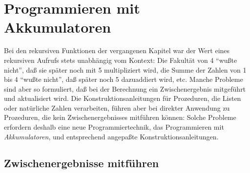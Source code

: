 
\chapter{Programmieren mit Akkumulatoren}
\label{cha:accu}

Bei den rekursiven Funktionen der vergangenen Kapitel war der Wert
eines rekursiven Aufrufs stets unabhängig vom Kontext: Die Fakultät
von 4 "`wußte nicht"', daß sie später noch mit 5 multipliziert wird,
die Summe der Zahlen von 1 bis 4 "`wußte nicht"', daß später noch 5
dazuaddiert wird, etc.  Manche Probleme sind aber so formuliert, daß
bei der Berechnung ein Zwischenergebnis mitgeführt und aktualisiert
wird.  Die Konstruktionsanleitungen für Prozeduren, die Listen oder
natürliche Zahlen verarbeiten, führen aber bei direkter Anwendung zu
Prozeduren, die kein Zwischenergebnisses mitführen können: Solche
Probleme erfordern deshalb eine neue Programmiertechnik, das
Programmieren mit \textit{Akkumulatoren}, und entsprechend angepaßte
Konstruktionsanleitungen.


\section{Zwischenergebnisse mitführen}
\label{sec:intermediate-results}

